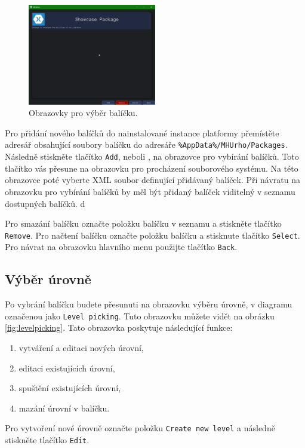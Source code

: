 \begin{figure}[h]
	\centering
	\includegraphics[width=0.5\textwidth]{img/PackagePickingScreen.png}
	\caption{Obrazovky pro výběr balíčku.}
	\label{fig:packagepicking}
\end{figure}

Pro přidání nového balíčků do nainstalované instance platformy přemístěte adresář obsahující soubory balíčku do adresáře \texttt{\%AppData\%/MHUrho/Packages}. Následně stiskněte tlačítko \texttt{Add}, neboli , na obrazovce pro vybírání balíčků. Toto tlačítko vás přesune na obrazovku pro procházení souborového systému. Na této obrazovce poté vyberte XML soubor definující přidávaný balíček. Při návratu na obrazovku pro vybírání balíčků by měl být přidaný balíček viditelný v seznamu dostupných balíčků. d

Pro smazání balíčku označte položku balíčku v seznamu a stiskněte tlačítko \texttt{Remove}. Pro načtení balíčku  označte položku balíčku a stisknute tlačítko \texttt{Select}. Pro návrat na obrazovku hlavního menu použijte tlačítko \texttt{Back}.

\subsection{Výběr úrovně}
Po vybrání balíčku budete přesunuti na obrazovku výběru úrovně, v diagramu označenou jako \texttt{Level picking}. Tuto obrazovku můžete vidět na obrázku \ref{fig:levelpicking}. Tato obrazovka poskytuje následující funkce:

\begin{enumerate}
	\item vytváření a editaci nových úrovní,
	\item editaci existujících úrovní,
	\item spuštění existujících úrovní,
	\item mazání úrovní v balíčku.
\end{enumerate}

Pro vytvoření nové úrovně označte položku \texttt{Create new level} a následně stiskněte tlačítko \texttt{Edit}.


